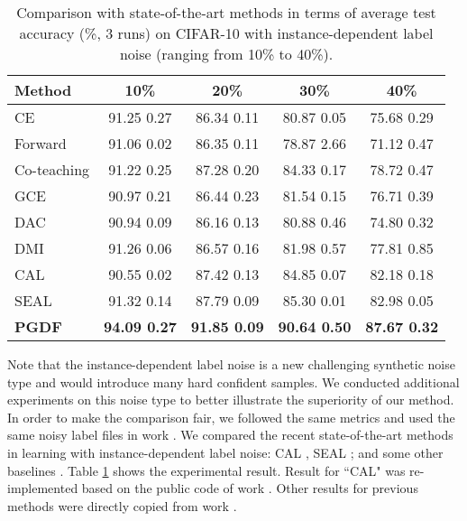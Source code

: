 \documentclass[letterpaper]{article} \usepackage{aaai22}  \usepackage{times}  \usepackage{helvet}  \usepackage{courier}  \usepackage[hyphens]{url}  \usepackage{graphicx} \urlstyle{rm} \def\UrlFont{\rm}  \usepackage{natbib}  \usepackage{caption} \DeclareCaptionStyle{ruled}{labelfont=normalfont,labelsep=colon,strut=off} \frenchspacing  \setlength{\pdfpagewidth}{8.5in}  \setlength{\pdfpageheight}{11in}  \usepackage{algorithm}
\begin{document}
\begin{table}[]
\caption{Comparison with state-of-the-art methods in terms of average test accuracy (\%, 3 runs) on CIFAR-10 with instance-dependent label noise (ranging from 10\% to 40\%).}
\vskip 0.15in
\scriptsize
\centering
\begin{tabular}{@{}l|cccc@{}}
\toprule
Method        & 10\%                & 20\%                & 30\%                & 40\%                \\ \midrule
CE            & 91.25  0.27          & 86.34  0.11          & 80.87  0.05          & 75.68  0.29          \\
Forward       & 91.06  0.02          & 86.35  0.11          & 78.87  2.66          & 71.12  0.47          \\
Co-teaching   & 91.22  0.25          & 87.28  0.20          & 84.33  0.17          & 78.72  0.47          \\
GCE           & 90.97  0.21          & 86.44  0.23          & 81.54  0.15          & 76.71  0.39          \\
DAC           & 90.94  0.09          & 86.16  0.13          & 80.88  0.46          & 74.80  0.32          \\
DMI           & 91.26  0.06          & 86.57  0.16          & 81.98  0.57          & 77.81  0.85          \\
CAL          & 90.55  0.02          & 87.42  0.13          & 84.85  0.07          & 82.18  0.18          \\
SEAL         & 91.32  0.14          & 87.79  0.09          & 85.30  0.01          & 82.98  0.05          \\ \midrule
\textbf{PGDF} & \textbf{94.09  0.27} & \textbf{91.85  0.09} & \textbf{90.64  0.50} & \textbf{87.67  0.32} \\ \bottomrule
\end{tabular}
\label{idn}
\vskip -0.1in
\end{table}

{Note that the instance-dependent label noise is a new challenging synthetic noise type and would introduce many hard confident samples. We conducted additional experiments on this noise type to better illustrate the superiority of our method. In order to make the comparison fair, we followed the same metrics and used the same noisy label files in work \cite{chen2021beyond}. We compared the recent state-of-the-art methods in learning with instance-dependent label noise: CAL \cite{zhu2021second}, SEAL \cite{chen2021beyond}; and some other baselines \cite{patrini2017making,han2018co,zhang2018generalized,thulasidasan2019combating,xu2019l_dmi}. Table \ref{idn} shows the experimental result. Result for ``CAL" was re-implemented based on the public code of work \cite{zhu2021second}. Other results for previous 
methods were directly copied from work \cite{chen2021beyond}.}
\end{document}
